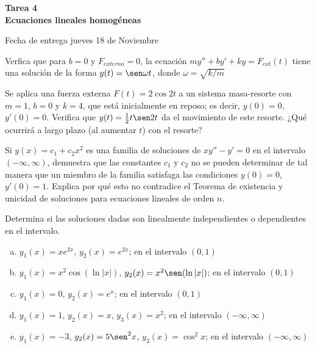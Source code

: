 \documentclass[12pt]{exam}
\begin{document}
\centering


\Large 
\textbf{\huge Tarea 4\\ \large Ecuaciones lineales homogéneas}

\small
Fecha de entrega jueves 18 de Noviembre
\vskip10pt

\normalsize

\pointformat{\bfseries\boldmath(\thepoints)}
\vskip10pt

    
    \begin{questions}
     \question%
     Verfica que para $b=0$ y $F_{externa}=0$, la ecuación $my''+by'+ky=F_{ext}(t)$ tiene una solución de la forma $y(t)=\sen \omega t$, donde $\omega=\sqrt{k/m}$
     

     \question%
     Se aplica una fuerza externa $F(t)=2\cos2t$ a un sistema masa-resorte con $m=1$, $b=0$ y $k=4$, que está inicialmente en reposo; es decir, $y(0)=0$, $y'(0)=0$. Verifica que $y(t)=\frac{1}{2}t\sen2t$ da el movimiento de este resorte. ¿Qué ocurrirá a largo plazo (al aumentar $t$) con el resorte?

     
     \question%
      Si $y(x)=c_1+c_2x^2$ es una familia de soluciones de $xy''-y'=0$ en el intervalo $(-\infty,\infty)$, demuestra que las constantes $c_1$ y $c_2$ no se pueden determinar de tal manera que un miembro de la familia satisfaga las condiciones $y(0)=0$, $y'(0)=1$. Explica  por qué esto no contradice el Teorema de existencia y unicidad de soluciones para ecuaciones lineales de orden $n$.
     


     \question%
     Determina si las soluciones dadas son linealmente independientes o dependientes en el intervalo.
     \begin{enumerate}[a)]
         \item $y_1(x)=xe^{2x}$, $y_2(x)=e^{2x}$; en el intervalo $(0,1)$
         \item $y_1(x)=x^2\cos(\ln|x|)$, $y_2(x)=x^2\sen(\ln|x|)$; en el intervalo $(0,1)$
         \item $y_1(x)=0$, $y_2(x)=e^x$; en el intervalo $(0,1)$
         \item $y_1(x)=1$, $y_2(x)=x$, $y_3(x)=x^2$; en el intervalo $(-\infty,\infty)$
         \item $y_1(x)=-3$, $y_2(x)=5\sen^2x$, $y_3(x)=\cos^2x$; en el intervalo $(-\infty,\infty)$
     \end{enumerate}






\end{questions}
\end{document}
